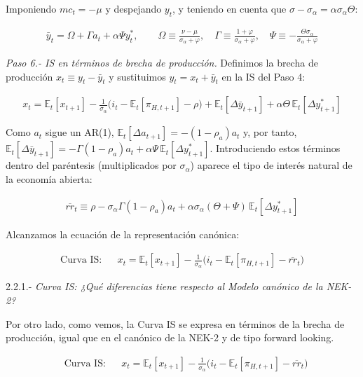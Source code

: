 \documentclass[10pt,a4paper]{article}
\begin{document}
Imponiendo $mc_t=-\mu$ y despejando $y_t$, y teniendo en cuenta que $\sigma-\sigma_\alpha=\alpha\sigma_\alpha\Theta$:

$$\begin{aligned}
    \boxed{\bar y_t=\Omega+\Gamma a_t+\alpha\Psi y_t^*},\qquad \Omega\equiv\frac{\nu-\mu}{\sigma_\alpha+\varphi},\quad \Gamma\equiv\frac{1+\varphi}{\sigma_\alpha+\varphi},\quad \Psi\equiv-\frac{\Theta\sigma_\alpha}{\sigma_\alpha+\varphi}
\end{aligned}$$

\textit{Paso 6.- IS en términos de brecha de producción.} Definimos la brecha de producción $x_t\equiv y_t-\bar y_t$ y sustituimos $y_t=x_t+\bar y_t$ en la IS del Paso 4:

$$\begin{aligned}
    x_t=\mathbb E_t[x_{t+1}]-\frac{1}{\sigma_\alpha}\big(i_t-\mathbb E_t[\pi_{H,t+1}]-\rho\big)+\mathbb E_t[\Delta\bar y_{t+1}]+\alpha\Theta\,\mathbb E_t[\Delta y_{t+1}^*]
\end{aligned}$$

Como $a_t$ sigue un AR(1), $\mathbb E_t[\Delta a_{t+1}]=-(1-\rho_a)a_t$ y, por tanto, $\mathbb E_t[\Delta\bar y_{t+1}]=-\Gamma(1-\rho_a)a_t+\alpha\Psi\,\mathbb E_t[\Delta y_{t+1}^*]$. Introduciendo estos términos dentro del paréntesis (multiplicados por $\sigma_\alpha$) aparece el tipo de interés natural de la economía abierta:

$$\begin{aligned}
    \overline{rr}_t\equiv\rho-\sigma_\alpha\Gamma(1-\rho_a)a_t+\alpha\sigma_\alpha(\Theta+\Psi)\,\mathbb E_t[\Delta y_{t+1}^*]
\end{aligned}$$

Alcanzamos la ecuación de la representación canónica:

$$\begin{aligned}
  \text{Curva IS}:&&\boxed{x_t = \mathbb E_t[x_{t+1}] - \frac{1}{\sigma_\alpha}\big(i_t - \mathbb E_t[\pi_{H,t+1}] - \overline{rr}_t\big)}
\end{aligned}$$


2.2.1.- \textit{Curva IS: ¿Qué diferencias tiene respecto al Modelo canónico de la NEK-2?}

Por otro lado, como vemos, la Curva IS se expresa en términos de la brecha de producción, igual que en el canónico de la NEK-2 y de tipo forward looking. 

$$\begin{aligned}
    &\text{Curva IS}:&&\boxed{x_t = \mathbb E_t[x_{t+1}] - \frac{1}{\sigma_\alpha}\big(i_t - \mathbb E_t[\pi_{H,t+1}] - \overline{rr}_t\big)}
\end{aligned}$$
\end{document}
